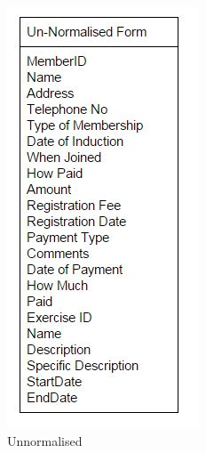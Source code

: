 \begin{itemize}
\begin{figure}[H]
    \includegraphics[width=\textwidth]{Norm1.JPG}
    \caption{Unnormalised} \label{fig: Unormalised}
\end{figure}


\end{itemize}
